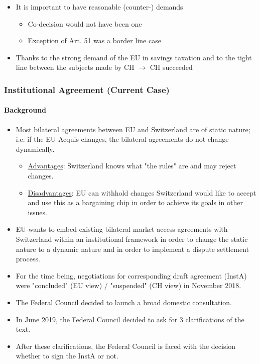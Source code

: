 \begin{itemize}
    \item It is important to have reasonable (counter-) demands
        \begin{itemize}
            \item Co-decision would not have been one
            \item Exception of Art. 51 was a border line case
        \end{itemize}
    \item Thanks to the strong demand of the EU in savings taxation and
        to the tight line between the subjects made by CH
        $\rightarrow$ CH succeeded
\end{itemize}


\subsubsection{Institutional Agreement (Current Case)}

\paragraph{Background}

\begin{itemize}
    \item Most bilateral agreements between EU and Switzerland are of static
        nature; i.e. if the EU-Acquis changes, the bilateral agreements do not
        change dynamically.
        \begin{itemize}
            \item \underline{Advantages}: Switzerland knows what "the rules"
                are and may reject changes.
            \item \underline{Disadvantages}: EU can withhold changes Switzerland
                would like to accept and use this as a bargaining chip in order
                to achieve its goals in other issues.
        \end{itemize}
    \item EU wants to embed existing bilateral market access-agreements with
        Switzerland within an institutional framework in order to change the
        static nature to a dynamic nature and in order to implement a dispute
        settlement process.
    \item For the time being, negotiations for corresponding draft agreement
        (InstA) were "concluded" (EU view) / "suspended" (CH view) in November
        2018.
    \item The Federal Council decided to launch a broad domestic consultation.
    \item In June 2019, the Federal Council decided to ask for 3 clarifications
        of the text.
    \item After these clarifications, the Federal Council is faced with the
        decision whether to sign the InstA or not.
\end{itemize}

